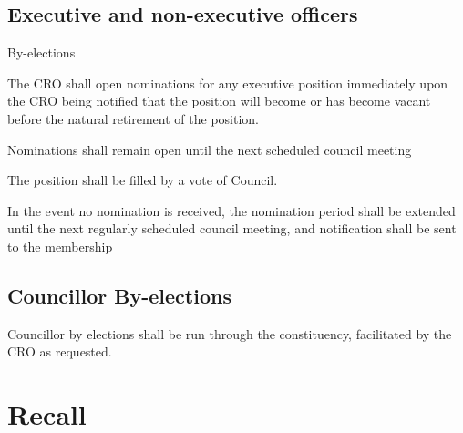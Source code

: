 \subsection {Executive and non-executive officers}

\begin{longenum}[ label*=\thesubsection.\arabic*., align=left]
\item By-elections
	\begin{longenum}[ label*=\arabic*., align=left]
		\item The CRO shall open nominations for any executive position immediately upon the CRO being
notified that the position will become or has become vacant before the natural retirement of the
position.
		\item Nominations shall remain open until the next scheduled council meeting
		\item The position shall be filled by a vote of Council.
		\item In the event no nomination is received, the nomination period shall be extended until the next
regularly scheduled council meeting, and notification shall be sent to the membership
	\end{longenum}
\end{longenum}    
\subsection{Councillor By-elections}
\begin{longenum}[ label*=\thesubsection.\arabic*., align=left]
	\item Councillor by elections shall be run through the constituency, facilitated by the CRO as requested.
\end{longenum}    
\newpage

\section{Recall}
